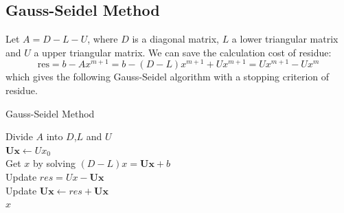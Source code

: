 \documentclass[12pt]{article}
\begin{document}
\subsection{Gauss-Seidel Method}
Let $A = D - L - U$, where $D$ is a diagonal matrix, $L$ a lower triangular matrix and $U$ a upper triangular matrix. We can save the calculation cost of residue:
$$
\text{res} = b - Ax^{m+1} = b - (D-L)x^{m+1} + Ux^{m+1} = Ux^{m+1} - Ux^m
$$
which gives the following Gauss-Seidel algorithm with a stopping criterion of residue.
\begin{algorithm}[!htb]
  \caption{Gauss-Seidel Method}  
  \label{alg:GS}
  Divide $A$ into $D$,$L$ and $U$\\
  $\mathbf{Ux} \gets Ux_0$\\
  { 
  	Get $x$ by solving $(D-L)x = \mathbf{Ux} + b$\\
  	Update $res = Ux - \mathbf{Ux}$\\
  	Update $\mathbf{Ux} \gets res + \mathbf{Ux}$\\
  }
  \Return $x$\;
\end{algorithm}
\end{document}
